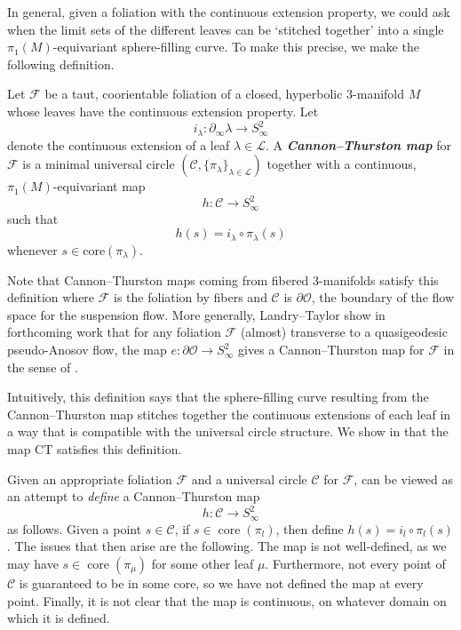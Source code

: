 \documentclass[11pt]{amsart}
\renewcommand{\l}{\lambda}
\newcommand{\mc}{\mathcal}
\newcommand{\orb}{\mathcal{O}}
\newcommand{\defn}[1]{\textbf{\emph{#1}}}
\DeclareMathOperator{\core}{core}
\newcommand{\ct}{\mathrm{CT}}
\numberwithin{equation}{section}
\theoremstyle{definition}
\begin{document}
\medskip

In general, given a foliation with the continuous extension property, we could ask when the limit sets of the different leaves can be `stitched together' into a single $\pi_1(M)$-equivariant sphere-filling curve. To make this precise, we make the following definition.

\begin{definition}\label{def:ct_for_fol}
	Let $\mc F$ be a taut, coorientable foliation of a closed, hyperbolic 3-manifold $M$ whose leaves have the continuous extension property. Let 
	\[
	i_\l\colon\partial_\infty\l\to S^2_\infty
	\] 
	denote the continuous extension of a leaf $\l\in\mc L$. A \defn{Cannon--Thurston map} for $\mc F$ is a minimal universal circle $(\mc C,\{\pi_\l\}_{\l\in\mc L})$ together with a continuous, $\pi_1(M)$-equivariant map 
	\[
	h\colon\mc C\to S^2_\infty
	\]
	such that 
	\[
	h(s)=i_\l\circ\pi_\l(s)
	\]
	whenever $s\in\mathrm{core}(\pi_\l)$.
\end{definition}

Note that Cannon--Thurston maps coming from fibered 3-manifolds satisfy this definition where $\mc F$ is the foliation by fibers and $\mc C$ is $\partial\orb$, the boundary of the flow space for the suspension flow. More generally, Landry--Taylor show in forthcoming work \cite{LT} that for any foliation $\mc F$ (almost) transverse to a quasigeodesic pseudo-Anosov flow, the map $e\colon\partial\orb\to S^2_\infty$ gives a Cannon--Thurston map for $\mc F$ in the sense of .

Intuitively, this definition says that the sphere-filling curve resulting from the Cannon--Thurston map stitches together the continuous extensions of each leaf in a way that is compatible with the universal circle structure. We show in  that the map $\ct$ satisfies this definition.

Given an appropriate foliation $\mc F$ and a universal circle $\mc C$ for $\mc F$,  can be viewed as an attempt to \emph{define} a Cannon--Thurston map 
\[
h\colon\mc C\to S^2_\infty
\]
as follows. Given a point $s\in \mc C$, if $s\in\core(\pi_l)$, then define $h(s)=i_l\circ\pi_l(s)$. The issues that then arise are the following. The map is not well-defined, as we may have $s\in\core(\pi_\mu)$ for some other leaf $\mu$. Furthermore, not every point of $\mc C$ is guaranteed to be in some core, so we have not defined the map at every point. Finally, it is not clear that the map is continuous, on whatever domain on which it is defined.
\end{document}
